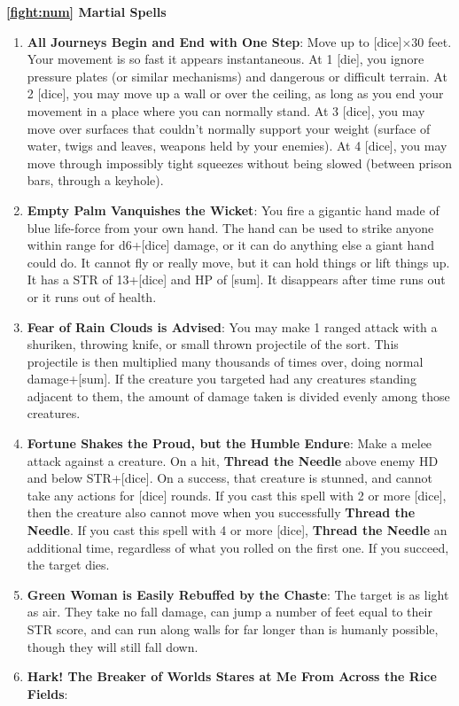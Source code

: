 \documentclass[twoside]{article}
\newcommand{\TTN}[2]{\textbf{Thread the Needle} above #1 and below #2}
\begin{document}
\textbf{\ref{fight:num} Martial Spells}
\begin{enumerate}[nosep]
\item \textbf{All Journeys Begin and End with One Step}: Move up to [dice]$\times$30 feet. Your movement is so fast it appears instantaneous. At 1 [die], you ignore pressure plates (or similar mechanisms) and dangerous or difficult terrain. At 2 [dice], you may move up a wall or over the ceiling, as long as you end your movement in a place where you can normally stand. At 3 [dice], you may move over surfaces that couldn't normally support your weight (surface of water, twigs and leaves, weapons held by your enemies). At 4 [dice], you may move through impossibly tight squeezes without being slowed (between prison bars, through a keyhole).
\item \textbf{Empty Palm Vanquishes the Wicket}: You fire a gigantic hand made of blue life-force from your own hand. The hand can be used to strike anyone within range for d6+[dice] damage, or it can do anything else a giant hand could do. It cannot fly or really move, but it can hold things or lift things up. It has a STR of 13+[dice] and HP of [sum]. It disappears after time runs out or it runs out of health.
\item \textbf{Fear of Rain Clouds is Advised}: You may make 1 ranged attack with a shuriken, throwing knife, or small thrown projectile of the sort. This projectile is then multiplied many thousands of times over, doing normal damage+[sum]. If the creature you targeted had any creatures standing adjacent to them, the amount of damage taken is divided evenly among those creatures.
\item \textbf{Fortune Shakes the Proud, but the Humble Endure}: Make a melee attack against a creature. On a hit, \TTN{enemy HD}{STR+[dice]}. On a success, that creature is stunned, and cannot take any actions for [dice] rounds. If you cast this spell with 2 or more [dice], then the creature also cannot move when you successfully \textbf{Thread the Needle}. If you cast this spell with 4 or more [dice], \textbf{Thread the Needle} an additional time, regardless of what you rolled on the first one. If you succeed, the target dies.
\item \textbf{Green Woman is Easily Rebuffed by the Chaste}: The target is as light as air. They take no fall damage, can jump a number of feet equal to their STR score, and can run along walls for far longer than is humanly possible, though they will still fall down.
\item \textbf{Hark! The Breaker of Worlds Stares at Me From Across the Rice Fields}:

\end{enumerate}
\end{document}
